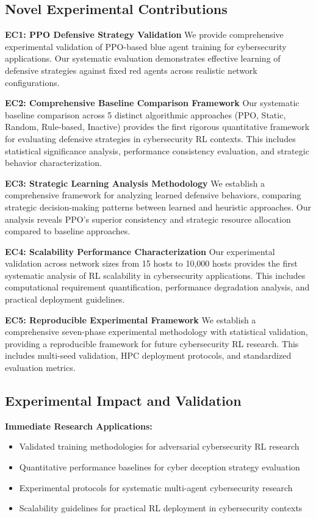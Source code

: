 \documentclass[12pt,twoside]{article}
\begin{document}
\subsection{Novel Experimental Contributions}

\textbf{EC1: PPO Defensive Strategy Validation}
We provide comprehensive experimental validation of PPO-based blue agent training for cybersecurity applications. Our systematic evaluation demonstrates effective learning of defensive strategies against fixed red agents across realistic network configurations.

\textbf{EC2: Comprehensive Baseline Comparison Framework}
Our systematic baseline comparison across 5 distinct algorithmic approaches (PPO, Static, Random, Rule-based, Inactive) provides the first rigorous quantitative framework for evaluating defensive strategies in cybersecurity RL contexts. This includes statistical significance analysis, performance consistency evaluation, and strategic behavior characterization.

\textbf{EC3: Strategic Learning Analysis Methodology}
We establish a comprehensive framework for analyzing learned defensive behaviors, comparing strategic decision-making patterns between learned and heuristic approaches. Our analysis reveals PPO's superior consistency and strategic resource allocation compared to baseline approaches.

\textbf{EC4: Scalability Performance Characterization}
Our experimental validation across network sizes from 15 hosts to 10,000 hosts provides the first systematic analysis of RL scalability in cybersecurity applications. This includes computational requirement quantification, performance degradation analysis, and practical deployment guidelines.

\textbf{EC5: Reproducible Experimental Framework}
We establish a comprehensive seven-phase experimental methodology with statistical validation, providing a reproducible framework for future cybersecurity RL research. This includes multi-seed validation, HPC deployment protocols, and standardized evaluation metrics.

\subsection{Experimental Impact and Validation}

\textbf{Immediate Research Applications:}
\begin{itemize}
\item Validated training methodologies for adversarial cybersecurity RL research
\item Quantitative performance baselines for cyber deception strategy evaluation  
\item Experimental protocols for systematic multi-agent cybersecurity research
\item Scalability guidelines for practical RL deployment in cybersecurity contexts
\end{itemize}
\end{document}
